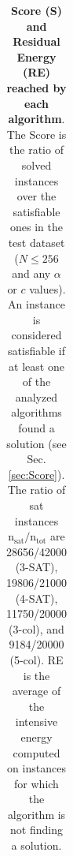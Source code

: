 \documentclass{article}
\begin{document}
\begin{table}
\begin{center}
\begin{minipage}{0.502\textwidth}
{\begin{tabular}{ | c|| c | c | c | c |}
    \end{tabular}
    }
\end{minipage}
\hfill
\begin{minipage}{0.475\textwidth}
\centering
{}
\end{minipage}
\end{center}
\caption{\textbf{Score (S) and Residual Energy (RE) reached by each algorithm}. The Score is the ratio of solved instances over the satisfiable ones in the test dataset ($N \le 256$ and any $\alpha$ or $c$ values). An instance is considered satisfiable if at least one of the analyzed algorithms found a solution (see Sec. \ref{sec:Score}). The ratio of sat instances $\text{n}_{\text{sat}}/\text{n}_{\text{tot}}$ are 28656/42000 (3-SAT), 19806/21000 (4-SAT), 11750/20000 (3-col), and 9184/20000 (5-col). RE is the average of the intensive energy computed on instances for which the algorithm is not finding a solution. 
}
\end{table}
\end{document}
